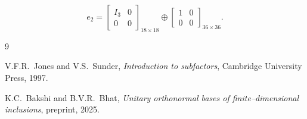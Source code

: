 \documentclass[11pt]{article}
\theoremstyle{mytheoremstyle}
\theoremstyle{definition}
\theoremstyle{remark}
\begin{document}
\[
e_{2} = \begin{bmatrix} I_3 & 0 \\ 0 & 0 \end{bmatrix}_{18 \times 18} \oplus \begin{bmatrix} 1 & 0 \\ 0 & 0 \end{bmatrix}_{36 \times 36}.
\]


\begin{thebibliography}{9}

 V.F.R.~Jones and V.S.~Sunder,
 \emph{Introduction to subfactors},
 Cambridge University Press, 1997.

 K.C.~Bakshi and B.V.R.~Bhat,
 \emph{Unitary orthonormal bases of finite–dimensional inclusions},
 preprint, 2025.
\end{thebibliography}
\end{document}
